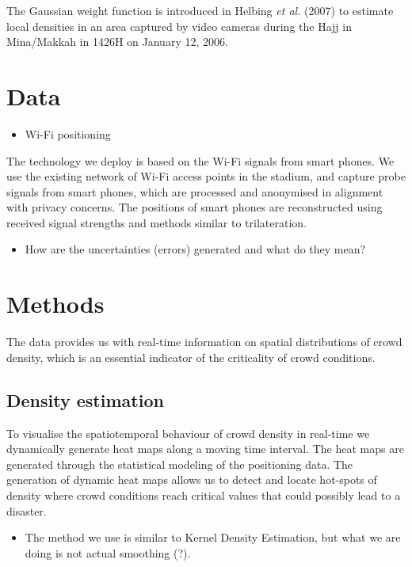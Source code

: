 \documentclass[10pt,a4paper]{article}
\begin{document}
The Gaussian weight function is introduced in Helbing \textit{et al.} (2007) \cite{helbing:1} to estimate local densities in an area captured by video cameras during the Hajj in Mina/Makkah in 1426H on January 12, 2006.


\section{Data}

\begin{itemize}
\item Wi-Fi positioning
\end{itemize}

The technology we deploy is based on the Wi-Fi signals from smart phones. We use the existing network of Wi-Fi access points in the stadium, and capture probe signals from smart phones, which are processed and anonymised in alignment with privacy concerns. The positions of smart phones are reconstructed using received signal strengths and methods similar to trilateration. 

\begin{itemize}
\item How are the uncertainties (errors) generated and what do they mean?
\end{itemize}

\section{Methods}

The data provides us with real-time information on spatial distributions of crowd density, which is an essential indicator of the criticality of crowd conditions. 

\subsection{Density estimation}

To visualise the spatiotemporal behaviour of crowd density in real-time we dynamically generate heat maps along a moving time interval. The heat maps are generated through the statistical modeling of the positioning data. The generation of dynamic heat maps allows us to detect and locate hot-spots of density where crowd conditions reach critical values that could possibly lead to a disaster.

\begin{itemize}
\item The method we use is similar to Kernel Density Estimation, but what we are doing is not actual smoothing (?).
\end{itemize}
\end{document}
